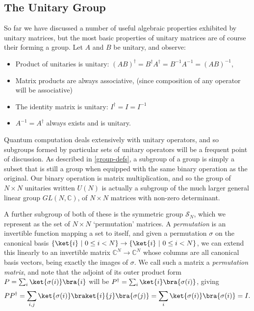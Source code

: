 \subsection{The Unitary Group}
So far we have discussed a number of useful algebraic properties exhibited by unitary matrices, but the most basic properties of unitary matrices are of course their forming a group. Let $A$ and $B$ be unitary, and observe:
\begin{itemize}
	\item Product of unitaries is unitary: ${(AB)}^\dagger = B^\dagger A^\dagger = B^{-1}A^{-1} = {(AB)}^{-1}$,
	\item Matrix products are always associative, (since composition of any operator will be associative)
	\item The identity matrix is unitary: $I^\dagger = I = I^{-1}$
	\item $A^{-1} = A^\dagger$ always exists and is unitary.
\end{itemize}

Quantum computation deals extensively with unitary operators, and so subgroups formed by particular sets of unitary operators will be a frequent point of discussion. As described in \autoref{group-defs}, a subgroup of a group is simply a subset that is still a group when equipped with the same binary operation as the original. Our binary operation is matrix multiplication, and so the group of $N \times N$ unitaries written $U(N)$ is actually a subgroup of the much larger general linear group $GL(N, \mathbb{C})$, of $N \times N$ matrices with non-zero determinant.

A further subgroup of both of these is the symmetric group $\mathcal{S}_N$, which we represent as the set of $N \times N$ `permutation' matrices. A \emph{permutation} is an invertible function mapping a set to itself, and given a permutation $\sigma$ on the canonical basis $\{\ket{i}\ |\ 0 \leq i < N\} \to \{\ket{i}\ |\ 0 \leq i < N\}$, we can extend this linearly to an invertible matrix $\mathbb{C}^N \to \mathbb{C}^N$ whose columns are all canonical basis vectors, being exactly the images of $\sigma$. We call such a matrix a \emph{permutation matrix}, and note that the adjoint of its outer product form $P = \sum_i \ket{\sigma(i)}\bra{i}$ will be $P^{\dagger} = \sum_i \ket{i}\bra{\sigma(i)}$, giving
\begin{align*}
	PP^\dagger = \sum_{i,j} \ket{\sigma(i)}\braket{i}{j}\bra{\sigma(j)} = \sum_i \ket{\sigma(i)}\bra{\sigma(i)} = I.
\end{align*}

